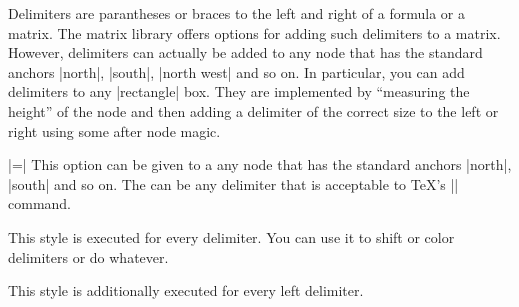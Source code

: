 Delimiters are parantheses or braces to the left and right of a
formula or a matrix. The matrix library offers options for adding such
delimiters to a matrix. However, delimiters can actually be added to
any node that has the standard anchors |north|, |south|, |north west|
and so on. In particular, you can add delimiters to any |rectangle|
box. They are implemented by ``measuring the height'' of the node and
then adding a delimiter of the correct size to the left or right using
some after node magic.

\begin{itemize}
  |=|
  This option can be given to a any node that has the standard anchors
  |north|, |south| and so on. The  can be any
  delimiter that is acceptable to \TeX's |\left| command.
\begin{codeexample}[]
\end{codeexample}

\begin{codeexample}[]
\end{codeexample}

  This style is executed for every delimiter. You can use it to shift
  or color delimiters or do whatever.

  This style is additionally executed for every left delimiter.
\begin{codeexample}[]
\end{codeexample}


\end{itemize}
